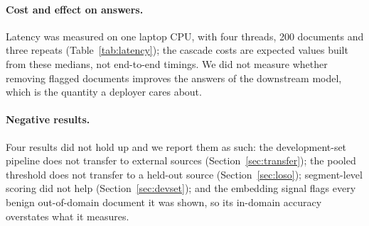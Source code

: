 \paragraph{Cost and effect on answers.}
Latency was measured on one laptop CPU, with four threads, 200 documents and three
repeats (Table~\ref{tab:latency}); the cascade costs are expected values built from
these medians, not end-to-end timings. We did not measure whether removing flagged
documents improves the answers of the downstream model, which is the quantity a
deployer cares about.

\paragraph{Negative results.}
Four results did not hold up and we report them as such: the development-set
pipeline does not transfer to external sources (Section~\ref{sec:transfer}); the
pooled threshold does not transfer to a held-out source
(Section~\ref{sec:loso}); segment-level scoring did not help
(Section~\ref{sec:devset}); and the embedding signal flags every benign
out-of-domain document it was shown, so its in-domain accuracy overstates what it
measures.